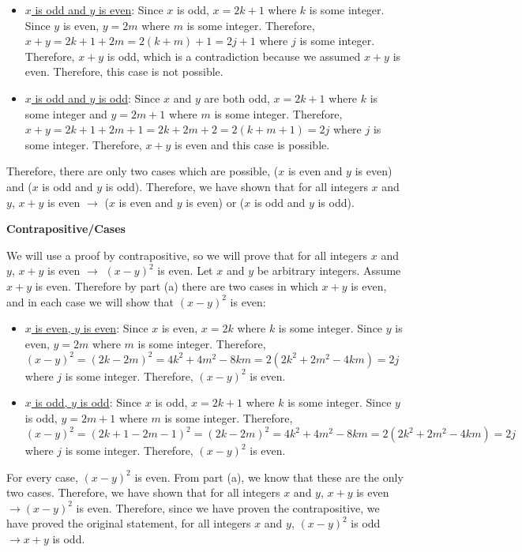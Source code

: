 \documentclass[12pt]{exam}
\begin{document}
\begin{solution}
\begin{qparts}
\begin{itemize}
        \item \underline{$x$ is odd and $y$ is even}: Since $x$ is odd, $x = 2k + 1$ where $k$ is some integer. Since $y$ is even, $y = 2m$ where $m$ is some integer. Therefore, $x + y = 2k + 1 + 2m = 2(k + m) + 1 = 2j + 1$ where $j$ is some integer. Therefore, $x + y$ is odd, which is a contradiction because we assumed $x + y$ is even. Therefore, this case is not possible.

        \item \underline{$x$ is odd and $y$ is odd}: Since $x$ and $y$ are both odd, $x = 2k + 1$ where $k$ is some integer and $y = 2m + 1$ where $m$ is some integer. Therefore, $x + y = 2k + 1 + 2m + 1 = 2k + 2m + 2 = 2(k + m + 1) = 2j$ where $j$ is some integer. Therefore, $x + y$ is even and this case is possible.
    \end{itemize}
        Therefore, there are only two cases which are possible, ($x$ is even and $y$ is even) and ($x$ is odd and $y$ is odd). Therefore, we have shown that for all integers $x$ and $y$, $x + y$ is even $\rightarrow$ ($x$ is even and $y$ is even) or ($x$ is odd and $y$ is odd).

    \item \textbf{Contrapositive/Cases}
    
    We will use a proof by contrapositive, so we will prove that for all integers $x$ and $y$,  $x + y$ is even $\rightarrow$ $(x-y)^2$ is even. Let $x$ and $y$ be arbitrary integers. Assume $x + y$ is even. Therefore by part (a) there are two cases in which $x + y$ is even, and in each case we will show that $(x-y)^2$ is even:
        \begin{itemize}
            \item \underline{$x$ is even, $y$ is even}: Since $x$ is even, $x = 2k$ where $k$ is some integer. Since $y$ is even, $y = 2m$ where $m$ is some integer. Therefore, $(x-y)^2 = (2k - 2m)^2 = 4k^2 + 4m^2 - 8km = 2(2k^2 + 2m^2 - 4km) = 2j$ where $j$ is some integer. Therefore, $(x-y)^2$ is even.

            \item \underline{$x$ is odd, $y$ is odd}: Since $x$ is odd, $x = 2k + 1$ where $k$ is some integer. Since $y$ is odd, $y = 2m + 1$ where $m$ is some integer. Therefore, $(x - y)^2 = (2k + 1 - 2m - 1)^2 = (2k - 2m)^2 = 4k^2 + 4m^2 - 8km = 2(2k^2 + 2m^2 - 4km) = 2j$ where $j$ is some integer. Therefore, $(x-y)^2$ is even.
        \end{itemize}
            For every case, $(x-y)^2$ is even. From part (a), we know that these are the only two cases. Therefore, we have shown that for all integers $x$ and $y$, $x + y$ is even $\rightarrow (x-y)^2$ is even. Therefore, since we have proven the contrapositive, we have proved the original statement, for all integers $x$ and $y$, $(x - y)^2$ is odd $\rightarrow x + y$ is odd.
        

\end{qparts}
\end{solution}
\end{document}
